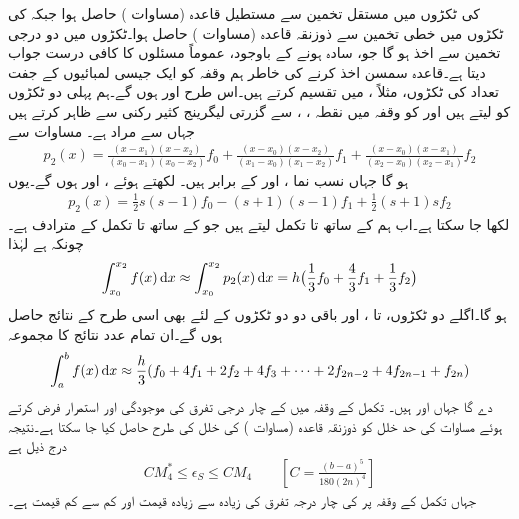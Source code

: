  کی ٹکڑوں میں مستقل تخمین سے مستطیل قاعدہ (مساوات ) حاصل ہوا جبکہ  کی ٹکڑوں میں خطی تخمین سے ذوزنقہ قاعدہ (مساوات ) حاصل ہوا۔ٹکڑوں میں دو درجی تخمین سے  اخذ ہو گا جو، سادہ ہونے کے باوجود،  عموماً مسئلوں کا کافی درست جواب دیتا ہے۔قاعدہ سمسن  اخذ کرنے کی خاطر ہم وقفہ  کو ایک جیسی لمبائیوں کے  جفت تعداد کی  ٹکڑوں، مثلاً ، میں تقسیم کرتے ہیں۔اس طرح  اور   ہوں گے۔ہم پہلی دو ٹکڑوں  کو لیتے ہیں اور   کو وقفہ  میں نقطہ ، ،  سے گزرتی  لیگرینج کثیر رکنی  سے ظاہر کرتے ہیں جہاں  سے مراد  ہے۔ مساوات  سے
\begin{multline}\label{مساوات_اعدادی_لیگرینج_کثیر_رکنی_الف}
p_2(x)=\frac{(x-x_1)(x-x_2)}{(x_0-x_1)(x_0-x_2)}f_0+\frac{(x-x_0)(x-x_2)}{(x_1-x_0)(x_1-x_2)}f_1+\frac{(x-x_0)(x-x_1)}{(x_2-x_0)(x_2-x_1)}f_2
\end{multline}
ہو گا جہاں نسب نما ،  اور  کے برابر ہیں۔  لکھتے ہوئے  ،  اور  ہوں گے۔یوں 
\begin{align}
p_2(x)=\frac{1}{2}s(s-1)f_0-(s+1)(s-1)f_1+\frac{1}{2}(s+1)sf_2
\end{align}
لکھا جا سکتا ہے۔اب ہم  کے ساتھ  تا  تکمل لیتے ہیں جو  کے ساتھ  تا  تکمل کے مترادف ہے۔چونکہ  ہے لہٰذا
\begin{align*}
\int_{x_0}^{x_2}f(x)\dif x\approx \int_{x_0}^{x_2}p_2(x)\dif x=h\big(\frac{1}{3}f_0+\frac{4}{3}f_1+\frac{1}{3}f_2\big)
\end{align*}
ہو گا۔اگلے دو ٹکڑوں،  تا ، اور باقی دو دو ٹکڑوں  کے لئے بھی  اسی طرح کے نتائج حاصل ہوں گے۔ان تمام  عدد نتائج کا مجموعہ 
\begin{align}\label{مساوات_اعدادی_تکمل_سمسن_قاعدہ}
\int_a^b f(x)\dif x\approx \frac{h}{3}(f_0+4f_1+2f_2+4f_3+\cdots+2f_{2n-2}+4f_{2n-1}+f_{2n})
\end{align}
دے گا جہاں  اور  ہیں۔ تکمل کے وقفہ میں  کے چار درجی تفرق کی موجودگی اور استمرار فرض کرتے ہوئے مساوات  کی حد خلل  کو ذوزنقہ قاعدہ (مساوات ) کی خلل کی طرح حاصل کیا جا سکتا ہے۔نتیجہ درج ذیل ہے
\begin{align}\label{مساوات_اعدادی_سمسن_حد_خلل}
CM_4^*\le \epsilon_S\le CM_4\quad \quad [C=\tfrac{(b-a)^5}{180(2n)^4}]
\end{align}
جہاں تکمل کے وقفہ پر  کی چار درجہ تفرق کی زیادہ سے زیادہ قیمت  اور کم سے کم قیمت  ہے۔

